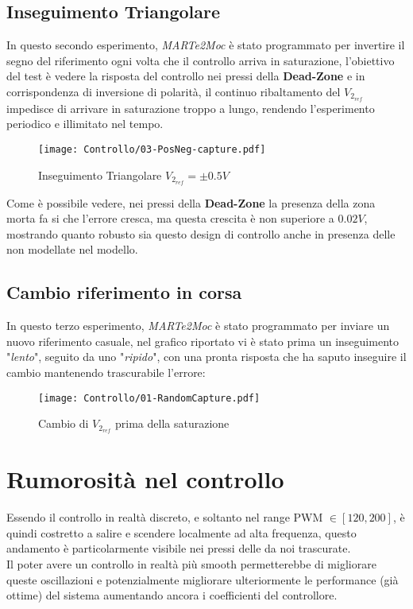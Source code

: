 \subsection{Inseguimento Triangolare}
In questo secondo esperimento, \textit{MARTe2Moc} è stato programmato per invertire il segno del riferimento ogni volta che il controllo arriva in saturazione, l'obiettivo del test è vedere la risposta del controllo nei pressi della \textbf{Dead-Zone} e in corrispondenza di inversione di polarità, il continuo ribaltamento del $ V_{2_{ref}} $ impedisce di arrivare in saturazione troppo a lungo, rendendo l'esperimento periodico e illimitato nel tempo.\vspace{-2mm}
\begin{figure}[H]
	\centering
	\caption[Inseguimento Triangolare $ V_{2_{ref}}=\pm0.5V $]{Inseguimento Triangolare $ V_{2_{ref}}=\pm0.5V $}
	\texttt{[image: Controllo/03-PosNeg-capture.pdf]}
\end{figure}\vspace{-8mm}
\noindent
Come è possibile vedere, nei pressi della \textbf{Dead-Zone} la presenza della zona morta fa si che l'errore cresca, ma questa crescita è non superiore a $ 0.02V $, mostrando quanto robusto sia questo design di controllo anche in presenza delle \nonLinearita non modellate nel modello.\\

\newpage

\subsection{Cambio riferimento in corsa}
In questo terzo esperimento, \textit{MARTe2Moc} è stato programmato per inviare un nuovo riferimento casuale, nel grafico riportato vi è stato prima un inseguimento "\textit{lento}", seguito da uno "\textit{ripido}", con una pronta risposta che ha saputo inseguire il cambio mantenendo trascurabile l'errore:\vspace{-2mm}
\begin{figure}[H]
	\centering
	\caption[Cambio di $ V_{2_{ref}} $ prima della saturazione]{Cambio di $ V_{2_{ref}} $ prima della saturazione}
	\texttt{[image: Controllo/01-RandomCapture.pdf]}
\end{figure}\vspace{-16mm}


\section{Rumorosità nel controllo}
Essendo il controllo in realtà discreto, e soltanto nel range PWM $\in \left[120,200\right] $, è quindi costretto a salire e scendere localmente ad alta frequenza, questo andamento è particolarmente visibile nei pressi delle \nonLinearita da noi trascurate.\\
Il poter avere un controllo in realtà più smooth permetterebbe di migliorare queste oscillazioni e potenzialmente migliorare ulteriormente le performance (già ottime) del sistema aumentando ancora i coefficienti del controllore.